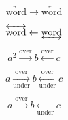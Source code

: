 \documentclass{article}
\begin{document}
\[ \underrightarrow{\mathrm{word}} \rightarrow  \underleftarrow{\mathrm{word}} \]

\[ \overleftrightarrow{\mathrm{word}} \leftarrow  \underleftrightarrow{\mathrm{word}}  \]

\[ a^2 \xrightarrow{\mathrm{over}} b  \xleftarrow{\mathrm{over}} c \]

\[ a \xrightarrow[\mathrm{under}]{\mathrm{over}} b  \xleftarrow[\mathrm{under}]{\mathrm{over}} c \]

\[ a \overset{\mathrm{over}}{\rightarrow} b \underset{\mathrm{under}}{\leftarrow} c \]
\end{document}
